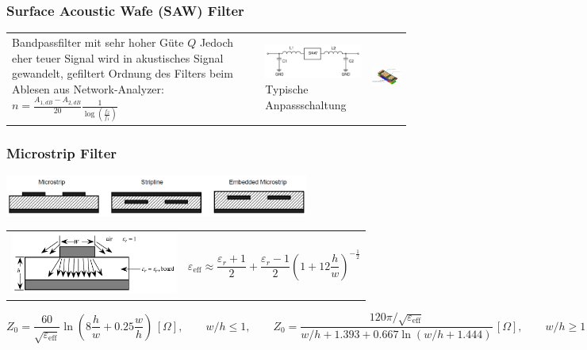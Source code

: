 \subsubsection{Surface Acoustic Wafe (SAW) Filter }
\begin{tabular}{lll} 
\parbox{6cm}{
	Bandpassfilter mit sehr hoher Güte $Q$\\
	Jedoch eher teuer \\
	Signal wird in akustisches Signal gewandelt, gefiltert \\ \\
	Ordnung des Filters beim Ablesen aus Network-Analyzer:\\ 
    $n = \frac{A_{1,dB}-A_{2,dB}}{20} \frac{1}{\log(\frac{f_2}{f_1})}$
	 } 
	 & \parbox{6cm}{ 	 
	\includegraphics[width=5.7cm]{./bilder/components_filter_SAW-schematic.png}	\\
	Typische Anpassschaltung		
		 }
	 & \parbox{6cm}{ 	 
	\includegraphics[width=5.7cm]{./bilder/components_filter_SAW.png}			
		 }
\end{tabular}

\subsubsection{Microstrip Filter }
\begin{center}
	\includegraphics[width=10cm]{./bilder/components_filter_microstrip_types.png}
	\begin{tabular}{ll} 
\parbox{6cm}{
	\includegraphics[width=5.5cm]{./bilder/components_filter_microstrip_EM-field.png}	
		 } 
	& \parbox{6cm}{ 		
	$$  \varepsilon_{\text{eff}} \approx 
    \frac{\varepsilon_r+1}2+
    \frac{\varepsilon_r-1}2 \left(1+12\frac hw \right)^{-\frac 12}$$	
		 } 
\end{tabular}
	$$   Z_0 = \frac{60}{\sqrt{\varepsilon_{\text{eff}}}}
        \ln \left(8\frac hw+0.25\frac wh \right)\,[\Omega],
        \qquad w/h\le 1, \label{eq:line_impedance1} 
  \qquad Z_0 = \frac{120\pi / \sqrt{\varepsilon_{\text{eff}}}}%
         {w/h+1.393+0.667\ln (w/h+1.444)}\,[\Omega],
        \qquad w/h\ge 1  \label{eq:line_impedance2}$$	
\end{center} 	


